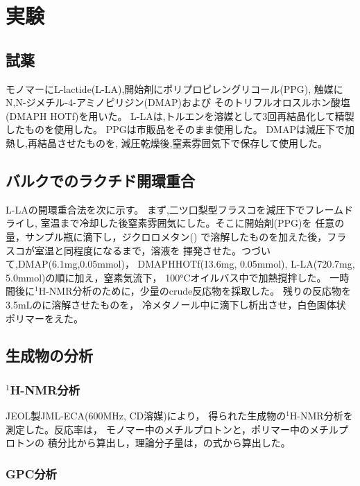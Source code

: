 \section{実験}

\subsection{試薬}
モノマーにL-lactide(L-LA),開始剤にポリプロピレングリコール(PPG),
触媒にN,N-ジメチル-4-アミノピリジン(DMAP)および
そのトリフルオロスルホン酸塩(DMAPH \cdot HOTf)を用いた。
L-LAは,トルエンを溶媒として3回再結晶化して精製したものを使用した。
PPGは市販品をそのまま使用した。
DMAPは減圧下で加熱し,再結晶させたものを,
減圧乾燥後,窒素雰囲気下で保存して使用した。

\subsection{バルクでのラクチド開環重合}
L-LAの開環重合法を次に示す。
まず,二ツ口梨型フラスコを減圧下でフレームドライし,
室温まで冷却した後窒素雰囲気にした。そこに開始剤(PPG)を
任意の量，サンプル瓶に滴下し，ジクロロメタン()
で溶解したものを加えた後，フラスコが室温と同程度になるまで，溶液を
揮発させた。つづいて,DMAP(6.1\si{\mg},0.05\si{\mmol})，
DMAPH\cdot HOTf(13.6\si{\mg}, 0.05\si{\mmol}),
L-LA(720.7\si{\mg}, 5.0\si{\mmol})の順に加え，窒素気流下，
100\si{\degreeCelsius}オイルバス中で加熱撹拌した。
一時間後に$^1$H-NMR分析のために，少量のcrude反応物を採取した。
残りの反応物を3.5\si{\mL}のに溶解させたものを，
冷メタノール中に滴下し析出させ，白色固体状ポリマーをえた。
\subsection{生成物の分析}

\subsubsection{$^1$H-NMR分析}
JEOL製JML-ECA(600\si{\MHz}, CD溶媒)により，
得られた生成物の$^1$H-NMR分析を測定した。反応率は，
モノマー中のメチルプロトンと，ポリマー中のメチルプロトンの
積分比から算出し，理論分子量は，の式から算出した。


\subsubsection{GPC分析}

